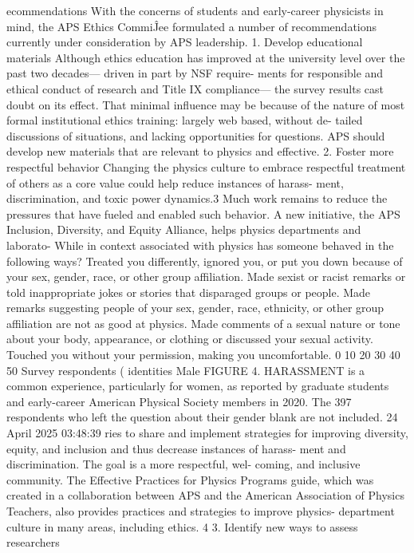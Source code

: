 ecommendations
With the concerns of students and early-career physicists
in mind, the APS Ethics CommiĴee formulated a number of
recommendations currently under consideration by APS
leadership.
1. Develop educational materials
Although ethics education has improved at the university level
over the past two decades— driven in part by NSF require-
ments for responsible and ethical conduct of research and Title
IX compliance— the survey results cast doubt on its effect. That
minimal influence may be because of the nature of most formal
institutional ethics training: largely web based, without de-
tailed discussions of situations, and lacking opportunities for
questions. APS should develop new materials that are relevant
to physics and effective.
2. Foster more respectful behavior
Changing the physics culture to embrace respectful treatment
of others as a core value could help reduce instances of harass-
ment, discrimination, and toxic power dynamics.3 Much work
remains to reduce the pressures that have fueled and enabled
such behavior. A new initiative, the APS Inclusion, Diversity,
and Equity Alliance, helps physics departments and laborato-
While in context associated with physics has someone
behaved in the following ways?
Treated you differently, ignored you, or put
you down because of your sex, gender,
race, or other group affiliation.
Made sexist or racist remarks or told
inappropriate jokes or stories that
disparaged groups or people.
Made remarks suggesting people of your
sex, gender, race, ethnicity, or other group
affiliation are not as good at physics.
Made comments of a sexual nature or tone
about your body, appearance, or clothing
or discussed your sexual activity.
Touched you without your permission,
making you uncomfortable.
0 10 20 30 40 50
Survey respondents (%
identities Male
FIGURE 4. HARASSMENT is a common experience, particularly for women, as reported
by graduate students and early-career American Physical Society members in 2020. The
397 respondents who left the question about their gender blank are not included.
24 April 2025 03:48:39
ries to share and implement strategies for improving diversity,
equity, and inclusion and thus decrease instances of harass-
ment and discrimination. The goal is a more respectful, wel-
coming, and inclusive community. The Effective Practices for
Physics Programs guide, which was created in a collaboration
between APS and the American Association of Physics Teachers,
also provides practices and strategies to improve physics-
department culture in many areas, including ethics. 4
3. Identify new ways to assess researchers
